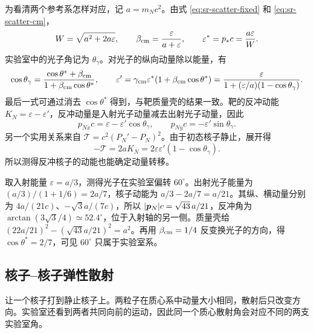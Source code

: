 为看清两个参考系怎样对应，记 $a=m_Nc^2$。由式 \eqref{eq:sr-scatter-fixed} 和 \eqref{eq:sr-scatter-cm}，
\[
W=\sqrt{a^2+2a\varepsilon},\qquad
\beta_{\rm cm}=\frac{\varepsilon}{a+\varepsilon},\qquad
\varepsilon^*=p_*c=\frac{a\varepsilon}{W}.
\]
实验室中的光子角记为 $\theta_\gamma$。对光子的纵向动量除以能量，有
\[
\cos\theta_\gamma=\frac{\cos\theta^*+\beta_{\rm cm}}
                       {1+\beta_{\rm cm}\cos\theta^*},\qquad
\varepsilon'=\gamma_{\rm cm}\varepsilon^*(1+\beta_{\rm cm}\cos\theta^*)
=\frac{\varepsilon}{1+(\varepsilon/a)(1-\cos\theta_\gamma)}.
\]
最后一式可通过消去 $\cos\theta^*$ 得到，与靶质量壳的结果一致。靶的反冲动能 $K_N=\varepsilon-\varepsilon'$，反冲动量是入射光子动量减去出射光子动量，因此
\[
p_{Nx}c=\varepsilon-\varepsilon'\cos\theta_\gamma,\qquad
p_{Ny}c=-\varepsilon'\sin\theta_\gamma .
\]
另一个实用关系来自 $\mathcal T=c^2(P_N'-P_N)^2$。由于初态核子静止，展开得
\begin{equation}\label{eq:sr-photon-recoil}
-\mathcal T=2a K_N=2\varepsilon\varepsilon'(1-\cos\theta_\gamma).
\end{equation}
所以测得反冲核子的动能也能确定动量转移。

\begin{example}
取入射能量 $\varepsilon=a/3$，测得光子在实验室偏转 $60^\circ$。出射光子能量为 $(a/3)/(1+1/6)=2a/7$，核子动能为 $a/3-2a/7=a/21$。其纵、横动量分别为 $4a/(21c)$、$-\sqrt3a/(7c)$，所以 $|\boldsymbol{p}_N|c=\sqrt{43}\,a/21$，反冲角为 $\arctan(3\sqrt3/4)\simeq52.4^\circ$，位于入射轴的另一侧。质量壳给 $(22a/21)^2-(\sqrt{43}a/21)^2=a^2$。再用 $\beta_{\rm cm}=1/4$ 反变换光子的方向，得 $\cos\theta^*=2/7$，可见 $60^\circ$ 只属于实验室系。
\end{example}

\subsection{核子--核子弹性散射}\label{sec:sr-nn-scatter}
让一个核子打到静止核子上。两粒子在质心系中动量大小相同，散射后只改变方向。实验室还看到两者共同向前的运动，因此同一个质心散射角会对应不同的两支实验室角。


